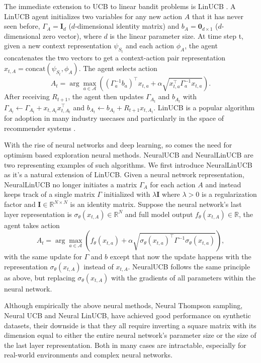 The immediate extension to UCB to linear bandit problems is LinUCB \cite{li2010contextual, chu2011contextual}. A LinUCB agent initializes two variables for any new action $A$ that it has never seen before, $\Gamma_A = \mathbf{I}_d$ ($d$-dimensional identity matrix) and $b_A = \mathbf{0}_{d\times 1}$ ($d$-dimensional zero vector), where $d$ is the linear parameter size. At time step t, given a new context representation $\psi_{S_t}$ and each action $\phi_{A}$, the agent concatenates the two vectors to get a context-action pair representation $x_{t, A} = \text{concat}(\psi_{S_t}, \phi_A)$. The agent selects action
\begin{equation}
    A_t = \arg\max_{a \in \mathcal{A}}\left((\Gamma^{-1}_a b_a)^\top x_{t, a} + \alpha \sqrt{x_{t, a}^\top\Gamma_a^{-1}x_{t, a}}\right).
\end{equation}
After receiving $R_{t+1}$, the agent then updates $\Gamma_{A_t}$ and $b_{A_t}$ with $\Gamma_{A_t} \leftarrow \Gamma_{A_t} + x_{t, A_t}x_{t, A_t}^\top$ and $b_{A_t} \leftarrow b_{A_t} + R_{t+1} x_{t, A_t}$. LinUCB is a popular algorithm for adoption in many industry usecases and particularly in the space of recommender systems \cite{li2010contextual, zhao2013interactive, qin2014contextual, wang2017biucb}. 

With the rise of neural networks and deep learning, so comes the need for optimism based exploration neural methods. NeuralUCB \cite{zhou2020neural} and NeuralLinUCB \cite{xu2021neural} are two representing examples of such algorithms. We first introduce NeuralLinUCB as it's a natural extension of LinUCB. Given a neural network representation, NeuralLinUCB no longer initiates a matrix $\Gamma_A$ for each action $A$ and instead keeps track of a single matrix $\Gamma$ initialized with $\lambda \mathbf{I}$ where $\lambda > 0$ is a regularization factor and $\mathbf{I} \in \mathbb{R}^{N \times N}$ is an identity matrix. Suppose the neural network's last layer representation is $\sigma_{\theta}(x_{t, A}) \in \mathbb{R}^N$ and full model output $f_\theta(x_{t, A}) \in \mathbb{R}$, the agent takes action
\begin{equation}
    A_t = \arg\max_{a \in \mathcal{A}}\left(f_{\theta}(x_{t, a}) + \alpha \sqrt{\sigma_{\theta}(x_{t, a})^\top\Gamma^{-1}\sigma_{\theta}(x_{t, a})}\right),
\end{equation}
with the same update for $\Gamma$ and $b$ except that now the update happens with the representation $\sigma_\theta(x_{t,A})$ instead of $x_{t,A}$. NeuralUCB follows the same principle as above, but replacing $\sigma_{\theta}(x_{t,A})$ with the gradients of all parameters within the neural network. 

Although empirically the above neural methods, Neural Thompson sampling, Neural UCB and Neural LinUCB, have achieved good performance on synthetic datasets, their downside is that they all require inverting a square matrix with its dimension equal to either the entire neural network's parameter size or the size of the last layer representation. Both in many cases are intractable, especially for real-world environments and complex neural networks. 